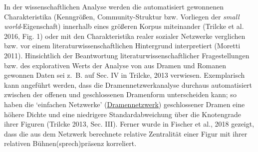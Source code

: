 \documentclass{article}
\begin{document}
        In der wissenschaftlichen Analyse werden die automatisiert gewonnenen
                  Charakteristika (Kenngrößen, Community-Struktur bzw. Vorliegen der \emph{small world}-Eigenschaft) innerhalb eines größeren Korpus
                  miteinander (Trilcke et al. 2016, Fig. 1) oder mit den
                  Charakteristika realer sozialer Netzwerke verglichen bzw. vor einem
                  literaturwissenschaftlichen Hintergrund interpretiert (Moretti 2011).
                  Hinsichtlich der Beantwortung literaturwissenschaftlicher Fragestellungen bzw. des
                  explorativen Werts der Analyse von aus Dramen und Romanen gewonnen Daten sei z. B.
                  auf Sec. IV in Trilcke, 2013 verwiesen. Exemplarisch kann angeführt werden, dass die
                  Dramennetzwerkanalyse durchaus automatisiert zwischen der offenen und
                  geschlossenen Dramenform unterscheiden kann; so haben die ‘einfachen Netzwerke’
                     (\href{http://gams.uni-graz.at/o:konde.73}{Dramennetzwerk}) geschlossener
                  Dramen eine höhere Dichte und eine niedrigere Standardabweichung über die
                  Knotengrade ihrer Figuren (Trilcke 2013, Sec. III). Ferner wurde in
                  Fischer et al., 2018 gezeigt, dass die aus dem Netzwerk berechnete relative
                  Zentralität einer Figur mit ihrer relativen Bühnen(sprech)präsenz korreliert.\\
            
\end{document}
